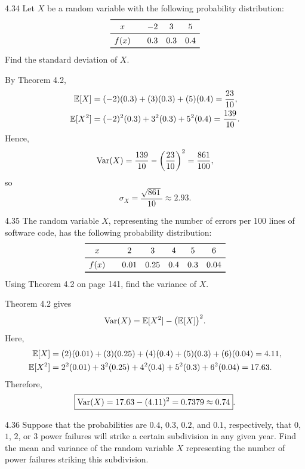 \documentclass[11pt,oneside]{article}
\begin{document}

\begin{exercise}{4.34}
Let $X$ be a random variable with the following probability distribution:
\[
\begin{array}{c@{\qquad}ccc}
\toprule
x & -2 & 3 & 5 \\
\midrule
f(x) & 0.3 & 0.3 & 0.4 \\
\bottomrule
\end{array}
\]
Find the standard deviation of $X$.
\end{exercise}

\begin{solution}
By Theorem 4.2,
\[
\begin{aligned}
    \mathbb{E}[X]
    &=(-2)(0.3)+(3)(0.3)+(5)(0.4)=\frac{23}{10},\\
    \mathbb{E}[X^2]
    &=(-2)^2(0.3)+3^2(0.3)+5^2(0.4)=\frac{139}{10}.
\end{aligned}
\]
Hence,
\[
    \operatorname{Var}(X)=\frac{139}{10}-\left(\frac{23}{10}\right)^2
    =\frac{861}{100},
\]
so
\[
    \boxed{\sigma_X=\frac{\sqrt{861}}{10}\approx2.93}.
\]
\end{solution}

\begin{exercise}{4.35}
The random variable $X$, representing the number of errors per 100 lines of software code, has the following probability distribution:
\[
\begin{array}{c@{\qquad}ccccc}
\toprule
x & 2 & 3 & 4 & 5 & 6 \\
\midrule
f(x) & 0.01 & 0.25 & 0.4 & 0.3 & 0.04 \\
\bottomrule
\end{array}
\]
Using Theorem 4.2 on page 141, find the variance of $X$.
\end{exercise}

\begin{solution}
Theorem 4.2 gives
\[
    \operatorname{Var}(X)=\mathbb{E}[X^2]-\bigl(\mathbb{E}[X]\bigr)^2.
\]
Here,
\[
\begin{aligned}
    \mathbb{E}[X]
    &=(2)(0.01)+(3)(0.25)+(4)(0.4)+(5)(0.3)+(6)(0.04)
      =4.11,\\
    \mathbb{E}[X^2]
    &=2^2(0.01)+3^2(0.25)+4^2(0.4)+5^2(0.3)+6^2(0.04)
      =17.63.
\end{aligned}
\]
Therefore,
\[
    \boxed{\operatorname{Var}(X)=17.63-(4.11)^2=0.7379\approx0.74}.
\]
\end{solution}

\begin{exercise}{4.36}
Suppose that the probabilities are $0.4$, $0.3$, $0.2$, and $0.1$, respectively, that $0$, $1$, $2$, or $3$ power failures will strike a certain subdivision in any given year. Find the mean and variance of the random variable $X$ representing the number of power failures striking this subdivision.
\end{exercise}
\end{document}
